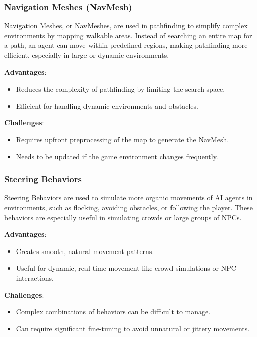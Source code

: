 \subsubsection{Navigation Meshes (NavMesh)}

Navigation Meshes, or NavMeshes, are used in pathfinding to simplify complex environments by mapping walkable areas. Instead of searching an entire map for a path, an agent can move within predefined regions, making pathfinding more efficient, especially in large or dynamic environments.

\textbf{Advantages}:
\begin{itemize}
    \item Reduces the complexity of pathfinding by limiting the search space.
    \item Efficient for handling dynamic environments and obstacles.
\end{itemize}

\textbf{Challenges}:
\begin{itemize}
    \item Requires upfront preprocessing of the map to generate the NavMesh.
    \item Needs to be updated if the game environment changes frequently.
\end{itemize}

\subsubsection{Steering Behaviors}

Steering Behaviors are used to simulate more organic movements of AI agents in environments, such as flocking, avoiding obstacles, or following the player. These behaviors are especially useful in simulating crowds or large groups of NPCs.

\textbf{Advantages}:
\begin{itemize}
    \item Creates smooth, natural movement patterns.
    \item Useful for dynamic, real-time movement like crowd simulations or NPC interactions.
\end{itemize}

\textbf{Challenges}:
\begin{itemize}
    \item Complex combinations of behaviors can be difficult to manage.
    \item Can require significant fine-tuning to avoid unnatural or jittery movements.
\end{itemize}


